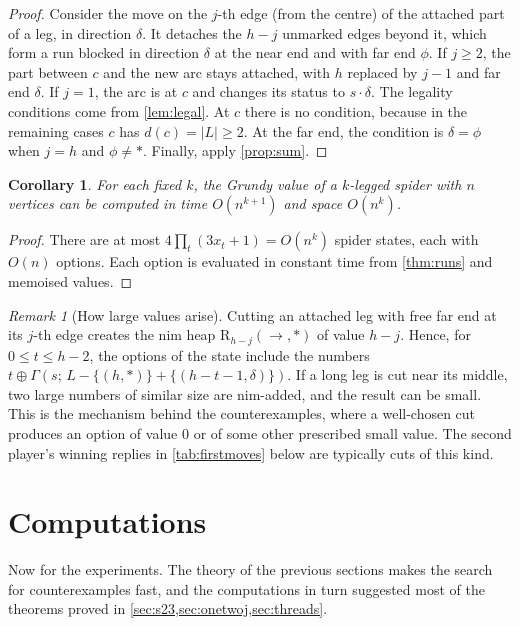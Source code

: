 \documentclass[11pt]{amsart}
\newtheorem{corollary}[theorem]{Corollary}
\theoremstyle{definition}
\theoremstyle{remark}
\newtheorem{remark}[theorem]{Remark}
\newcommand{\R}{\mathrm{R}}
\newcommand{\free}{\ast}
\newcommand{\rgt}{\rightarrow}
\begin{document}
\begin{proof}
Consider the move on the $j$-th edge (from the centre) of the attached part of a leg, in direction $\delta$. It detaches the $h-j$ unmarked edges beyond it, which form a run blocked in direction $\delta$ at the near end and with far end $\phi$. If $j\ge2$, the part between $c$ and the new arc stays attached, with $h$ replaced by $j-1$ and far end $\delta$. If $j=1$, the arc is at $c$ and changes its status to $s\cdot\delta$. The legality conditions come from \cref{lem:legal}. At $c$ there is no condition, because in the remaining cases $c$ has $d(c)=|L|\ge2$. At the far end, the condition is $\delta=\phi$ when $j=h$ and $\phi\ne\free$. Finally, apply \cref{prop:sum}.
\end{proof}

\begin{corollary}\label{cor:poly}
For each fixed $k$, the Grundy value of a $k$-legged spider with $n$ vertices can be computed in time $O(n^{k+1})$ and space $O(n^k)$.
\end{corollary}

\begin{proof}
There are at most $4\prod_t(3x_t+1)=O(n^k)$ spider states, each with $O(n)$ options. Each option is evaluated in constant time from \cref{thm:runs} and memoised values.
\end{proof}

\begin{remark}[How large values arise]\label{rem:large}
Cutting an attached leg with free far end at its $j$-th edge creates the nim heap $\R_{h-j}(\rgt,\free)$ of value $h-j$. Hence, for $0\le t\le h-2$, the options of the state include the numbers $t\oplus\Gamma(s;\,L-\{(h,\free)\}+\{(h-t-1,\delta)\})$. If a long leg is cut near its middle, two large numbers of similar size are nim-added, and the result can be small. This is the mechanism behind the counterexamples, where a well-chosen cut produces an option of value $0$ or of some other prescribed small value. The second player's winning replies in \cref{tab:firstmoves} below are typically cuts of this kind.
\end{remark}

\section{Computations}\label{sec:computation}

Now for the experiments. The theory of the previous sections makes the search for counterexamples fast, and the computations in turn suggested most of the theorems proved in \cref{sec:s23,sec:onetwoj,sec:threads}.
\end{document}
